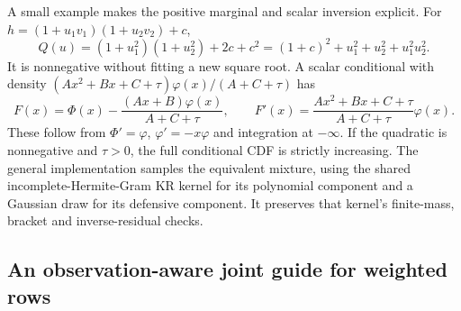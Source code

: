 \documentclass[11pt]{article}
\begin{document}
A small example makes the positive marginal and scalar inversion explicit.
For $h=(1+u_1v_1)(1+u_2v_2)+c$,
\begin{equation}
 Q(u)=(1+u_1^2)(1+u_2^2)+2c+c^2
      =(1+c)^2+u_1^2+u_2^2+u_1^2u_2^2.
 \label{eq:pair-example}
\end{equation}
It is nonnegative without fitting a new square root. A scalar conditional
with density $(Ax^2+Bx+C+\tau)\varphi(x)/(A+C+\tau)$ has
\begin{equation}
 F(x)=\Phi(x)-\frac{(Ax+B)\varphi(x)}{A+C+\tau},\qquad
 F'(x)=\frac{Ax^2+Bx+C+\tau}{A+C+\tau}\varphi(x).
 \label{eq:pair-cdf}
\end{equation}
These follow from $\Phi'=\varphi$, $\varphi'=-x\varphi$ and integration at
$-\infty$. If the quadratic is nonnegative and $\tau>0$, the full conditional
CDF is strictly increasing. The general implementation samples the equivalent
mixture, using the shared incomplete-Hermite-Gram KR kernel for its polynomial
component and a Gaussian draw for its defensive component. It preserves that
kernel's finite-mass, bracket and inverse-residual checks.

\subsection{An observation-aware joint guide for weighted rows}
\end{document}
